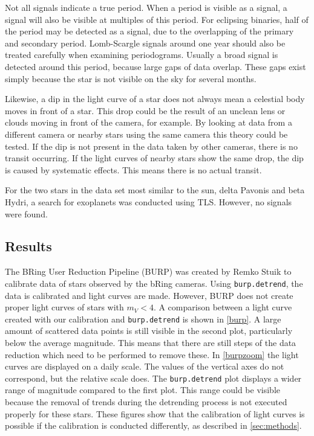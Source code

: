 \documentclass{aa}
\begin{document}
Not all signals indicate a true period.
When a period is visible as a signal, a signal will also be visible at multiples of this period. For eclipsing binaries, half of the period may be detected as a signal, due to the overlapping of the primary and secondary period.
%
Lomb-Scargle signals around one year should also be treated carefully when examining periodograms. Usually a broad signal is detected around this period, because large gaps of data overlap. These gaps exist simply because the star is not visible on the sky for several months.

Likewise, a dip in the light curve of a star does not always mean a celestial body moves in front of a star. This drop could be the result of an unclean lens or clouds moving in front of the camera, for example. By looking at data from a different camera or nearby stars using the same camera this theory could be tested. If the dip is not present in the data taken by other cameras, there is no transit occurring. If the light curves of nearby stars show the same drop, the dip is caused by systematic effects. This means there is no actual transit.

For the two stars in the data set most similar to the sun, delta Pavonis and beta Hydri, a search for exoplanets was conducted using TLS. However, no signals were found.


\subsection{Results}
The BRing User Reduction Pipeline (BURP) was created by Remko Stuik to calibrate data of stars observed by the bRing cameras. Using \texttt{burp.detrend}, the data is calibrated and light curves are made. However, BURP does not create proper light curves of stars with $m_V < 4$. A comparison between a light curve created with our calibration and \texttt{burp.detrend} is shown in \ref{burp}. A large amount of scattered data points is still visible in the second plot, particularly below the average magnitude. This means that there are still steps of the data reduction which need to be performed to remove these.
%
In \ref{burpzoom} the light curves are displayed on a daily scale. The values of the vertical axes do not correspond, but the relative scale does. The \texttt{burp.detrend} plot displays a wider range of magnitude compared to the first plot. This range could be visible because the removal of trends during the detrending process is not executed properly for these stars. These figures show that the calibration of light curves is possible if the calibration is conducted differently, as described in \ref{sec:methods}. 
\end{document}

